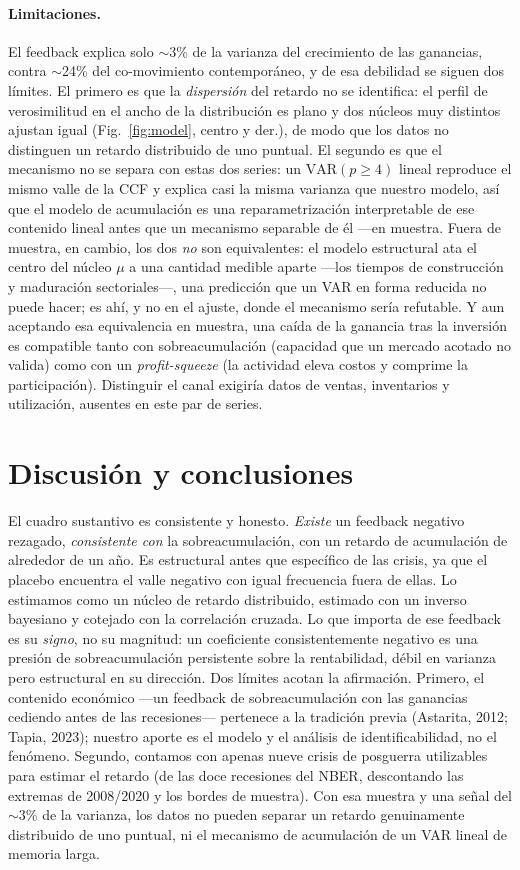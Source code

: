 \documentclass[11pt]{article}
\begin{document}
\paragraph{Limitaciones.}
El feedback explica solo $\sim$3\% de la varianza del crecimiento de las ganancias, contra
$\sim$24\% del co-movimiento contemporáneo, y de esa debilidad se siguen dos límites. El primero es
que la \emph{dispersión} del retardo no se identifica: el perfil de verosimilitud en el ancho de la
distribución es plano y dos núcleos muy distintos ajustan igual (Fig.~\ref{fig:model}, centro y
der.), de modo que los datos no distinguen un retardo distribuido de uno puntual. El segundo es que
el mecanismo no se separa con estas dos series: un $\mathrm{VAR}(p\!\ge\!4)$ lineal reproduce el
mismo valle de la CCF y explica casi la misma varianza que nuestro modelo, así que el modelo de
acumulación es una reparametrización
interpretable de ese contenido lineal antes que un mecanismo separable de él ---en muestra. Fuera de
muestra, en cambio, los dos \emph{no} son equivalentes: el modelo estructural ata el centro del
núcleo $\mu$ a una cantidad medible aparte ---los tiempos de construcción y maduración sectoriales---,
una predicción que un VAR en forma reducida no puede hacer; es ahí, y no en el ajuste, donde el
mecanismo sería refutable. Y aun aceptando esa equivalencia en muestra, una
caída de la ganancia tras la inversión es compatible tanto con sobreacumulación (capacidad que un
mercado acotado no valida) como con un \emph{profit-squeeze} (la actividad eleva costos y comprime la
participación). Distinguir el canal exigiría datos de ventas, inventarios y utilización, ausentes en
este par de series.

\section{Discusión y conclusiones}

El cuadro sustantivo es consistente y honesto. \emph{Existe} un feedback negativo rezagado, \emph{consistente con} la sobreacumulación, con un
retardo de acumulación de alrededor de un año. Es estructural antes que específico de las crisis, ya
que el placebo encuentra el valle negativo con igual frecuencia fuera de ellas. Lo estimamos como un
núcleo de retardo distribuido, estimado con un inverso bayesiano y cotejado con la correlación cruzada. Lo que importa de ese feedback es su \emph{signo}, no su magnitud: un coeficiente consistentemente negativo es una presión de sobreacumulación persistente sobre la rentabilidad, débil en varianza pero estructural en su dirección. Dos
límites acotan la afirmación. Primero, el contenido económico ---un feedback de sobreacumulación con
las ganancias cediendo antes de las recesiones--- pertenece a la tradición previa (Astarita, 2012;
Tapia, 2023); nuestro aporte es el modelo y el análisis de identificabilidad, no el fenómeno.
Segundo, contamos con apenas nueve crisis de posguerra utilizables para estimar el retardo (de las
doce recesiones del NBER, descontando las extremas de 2008/2020 y los bordes de muestra). Con esa
muestra y una señal del $\sim$3\% de la varianza, los datos no pueden separar un retardo genuinamente
distribuido de uno puntual, ni el mecanismo de acumulación de un VAR lineal de memoria larga.
\end{document}
